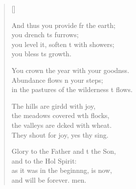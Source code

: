 \begin{verse}[\versewidth]
\begin{patverse}
And thus you provide fr the earth;\Med\\
you drench \pointup{\i}ts furrows;\\
you level it, soften \pointup{\i}t with showers;\Med\\
you bless \pointup{\i}ts growth.

You crown the year with your goodnss.\Flex\\
Abundance flows \pointup{\i}n your steps;\Med\\
in the pastures of the wilderness \pointup{\i}t flows.

The hills are girdd with joy,\Med\\
the meadows covered w\pointup{\i}th flocks,\\
the valleys are dcked with wheat.\Med\\
They shout for joy, yes thy sing.

Glory to the Father and t the Son,\Med\\
and to the Hol Spirit:\\
as it was in the beginn\pointup{\i}ng, is now,\Med\\
and will be forever. men. 
  \end{patverse}
\end{verse}
